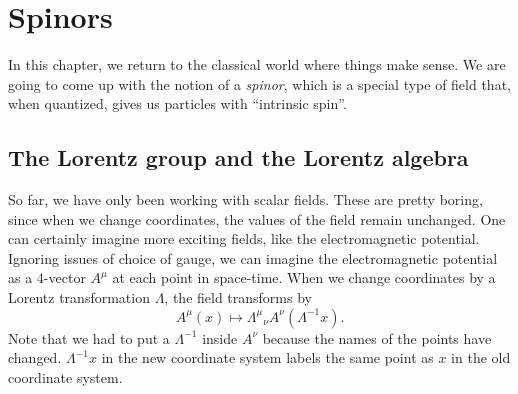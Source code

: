 \documentclass[a4paper]{article}
\begin{document}

\section{Spinors}
In this chapter, we return to the classical world where things make sense. We are going to come up with the notion of a \emph{spinor}, which is a special type of field that, when quantized, gives us particles with ``intrinsic spin''.

\subsection{The Lorentz group and the Lorentz algebra}
So far, we have only been working with scalar fields. These are pretty boring, since when we change coordinates, the values of the field remain unchanged. One can certainly imagine more exciting fields, like the electromagnetic potential. Ignoring issues of choice of gauge, we can imagine the electromagnetic potential as a $4$-vector $A^\mu$ at each point in space-time. When we change coordinates by a Lorentz transformation $\Lambda$, the field transforms by
\[
  A^\mu(x) \mapsto \Lambda^\mu\!_\nu A^\nu(\Lambda^{-1} x).
\]
Note that we had to put a $\Lambda^{-1}$ inside $A^\nu$ because the names of the points have changed. $\Lambda^{-1}x$ in the new coordinate system labels the same point as $x$ in the old coordinate system.
\end{document}
